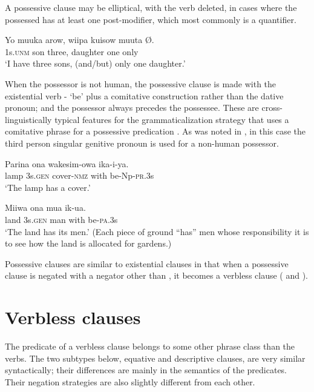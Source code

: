 A possessive clause may be elliptical, with the verb deleted, in cases where the possessed  has at least one post-modifier, which most commonly is a quantifier.

\ea%
\label{ex:5:x1322}
\gll Yo  muuka  arow,  wiipa  kuisow  muuta  {\O}. \\
     1s.\textsc{unm}  son  three,  daughter  one  only \\
\glt `I have three sons, (and/but) only one daughter.'
\z

When the possessor is not human, the possessive clause is made with the existential verb - `be' plus a comitative construction rather than the dative pronoun; and the possessor always precedes the possessee. These are cross-linguistically typical features for the grammaticalization strategy that uses a comitative phrase for a possessive predication \citep[53--57]{Heine1997}. As was noted in , in this case the third person singular genitive pronoun  is used for a non-human possessor.

\ea%
\label{ex:5:x1807}
\gll Parina  ona  wakesim-owa    ika-i-ya. \\
     lamp  3s.\textsc{gen}  cover-\textsc{nmz}  with  be-Np-\textsc{pr}.3s \\
\glt `The lamp has a cover.'
\z

\ea%
\label{ex:5:x1810}
\gll Miiwa  ona  mua    ik-ua. \\
     land  3s.\textsc{gen}  man  with  be-\textsc{pa}.3s \\
\glt `The land has its men.' (Each piece of ground ``has'' men whose responsibility it is to see how the land is allocated for gardens.)
\z

Possessive clauses are similar to existential clauses in that when a possessive clause is negated with a negator other than , it becomes a verbless clause ( and ).

\section{Verbless clauses} \label{sec:5.6}

The predicate of a verbless clause belongs to some other phrase class than the verbs. The two subtypes below, equative and descriptive clauses, are very similar syntactically; their differences are mainly in the semantics of the predicates. Their negation strategies are also slightly different from each other. 

